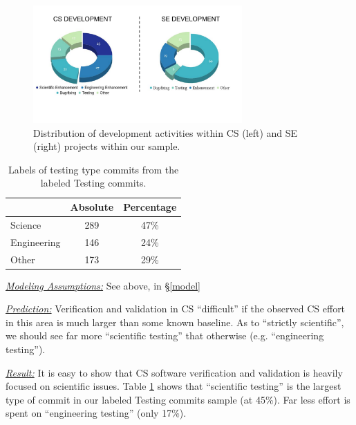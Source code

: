 \documentclass[sigconf,review,anonymous]{acmart}
\begin{document}
\hspace{-10mm} \begin{figure}
     \centering
     \includegraphics[width=1\linewidth, height=4.5cm]{img/activities.pdf} 


     \caption{Distribution of development activities within CS (left) and SE (right) projects within our sample.}
     \label{fig:SE_activities}
 \end{figure}


\begin{table}[!t]
\caption{Labels of testing type commits from the labeled Testing commits.}\label{tbl:testing}
\begin{center}
\vspace{-10pt}\begin{tabular}{l|c|c}
 \multicolumn{1}{c|}{} & \multicolumn{1}{c|}{Absolute} & \multicolumn{1}{c}{Percentage}\\
\hline
Science & 289 & 47\% \\
Engineering & 146 & 24\% \\
Other & 173 & 29\% 
\end{tabular}
\end{center}
\vspace{3mm}
\end{table}



\noindent \textit{\underline{Modeling Assumptions:}} See  above, in \S\ref{model}

\noindent \textit{\underline{Prediction:}}
Verification and validation in CS
``difficult'' if the observed CS effort in this area
is much larger than some known baseline.  As to ``strictly scientific'', we should see far more ``scientific
testing'' that otherwise (e.g. ``engineering testing''). 

\noindent \textit{\underline{Result:}}
It is easy to show that CS software verification and validation is heavily  focused on scientific issues.
Table \ref{tbl:testing} shows that ``scientific testing'' is the largest type of commit in our labeled Testing commits sample (at 45\%).  Far less effort is spent on ``engineering testing'' (only 17\%). 
\end{document}

